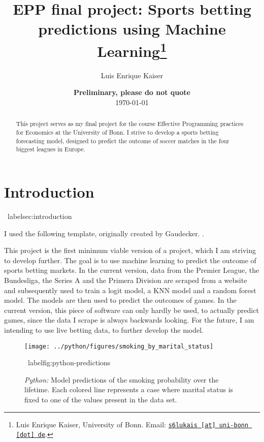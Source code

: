 \documentclass[11pt, a4paper, leqno]{article}
\begin{document}
\title{EPP final project: Sports betting predictions using Machine Learning\thanks{Luis Enrique Kaiser, University of Bonn. Email: \href{mailto:s6lukais@uni-bonn.de}{\nolinkurl{s6lukais [at] uni-bonn [dot] de}}.}}

\author{Luis Enrique Kaiser}

\date{
    {\bf Preliminary, please do not quote}
    \\[1ex]
    \today
}

\maketitle


\begin{abstract}
    This project serves as my final project for the course Effective Programming practices for Economics at the University of Bonn.
    I strive to develop a sports betting forecasting model, designed to predict the outcome of soccer matches in the four biggest
    leagues in Europe.
\end{abstract}

\clearpage


\section{Introduction} %
\ label{sec:introduction}

I used the following template, originally created by Gaudecker. \citet{GaudeckerEconProjectTemplates}.

This project is the first minimum viable version of a project, which I am striving to develop further.
The goal is to use machine learning to predict the outcome of sports betting markets. In the current version,
data from the Premier League, the Bundesliga, the Series A and the Primera Division are scraped from a website and
subsequently used to train a logit model, a KNN model and a random forest model. The models are then used to predict the outcomes of games.
In the current version, this piece of software can only hardly be used, to actually predict games, since the data I scrape is always backwards looking.
For the future, I am intending to use live betting data, to further develop the model.

\begin{figure}[H]

    \centering
    \texttt{[image: ../python/figures/smoking\_by\_marital\_status]}

    \caption{\emph{Python:} Model predictions of the smoking probability over the
        lifetime. Each colored line represents a case where marital status is fixed to one
        of the values present in the data set.}
    \ label{fig:python-predictions}

\end{figure}
\end{document}
